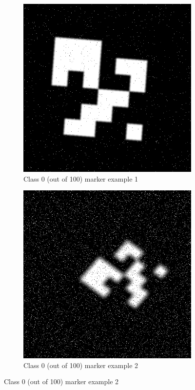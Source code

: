 \documentclass[conference]{IEEEtran}
\begin{document}
\begin{figure}[h]
  \centering
  \begin{subfigure}[b]{0.2\textwidth}
      \centering
      \includegraphics[width=\textwidth]{images/aruco-file3-classification-1.png}
      \caption{Class 0 (out of 100) marker example 1}
      \label{fig:class_ex1}
  \end{subfigure}
  \hfill
  \begin{subfigure}[b]{0.2\textwidth}
      \centering
      \includegraphics[width=\textwidth]{images/aruco-file3-classification-2.png}
      \caption{Class 0 (out of 100) marker example 2}
      \label{fig:class_ex2}
  \end{subfigure}
  

\end{figure}
\end{document}
